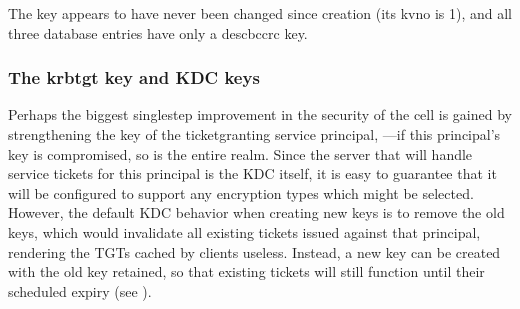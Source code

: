 \documentclass[letterpaper,10pt,english]{sphinxmanual}
\begin{document}
\begin{sphinxVerbatim}[commandchars=\\\{\}]
\PYG{p}{[} \PYG{p}{]}
\PYG{p}{[}\PYG{p}{]}
   
   
\PYG{p}{[}\PYG{p}{]}
\PYG{p}{[} \PYG{p}{]}
\PYG{p}{[}\PYG{p}{]}
   
   
\PYG{p}{[}\PYG{p}{]}
\PYG{p}{[} \PYG{p}{]}
\PYG{p}{[}\PYG{p}{]}
   
   
\PYG{p}{[}\PYG{p}{]}
\end{sphinxVerbatim}

\sphinxAtStartPar
The  key appears to have never been changed since creation
(its kvno is 1), and all three database entries have only a des\sphinxhyphen{}cbc\sphinxhyphen{}crc key.


\subsubsection{The krbtgt key and KDC keys}
\label{\detokenize{admin/advanced/retiring-des:the-krbtgt-key-and-kdc-keys}}
\sphinxAtStartPar
Perhaps the biggest single\sphinxhyphen{}step improvement in the security of the cell
is gained by strengthening the key of the ticket\sphinxhyphen{}granting service principal,
—if this principal’s key is compromised, so is the
entire realm.  Since the server that will handle service tickets
for this principal is the KDC itself, it is easy to guarantee that it
will be configured to support any encryption types which might be
selected.  However, the default KDC behavior when creating new keys is to
remove the old keys, which would invalidate all existing tickets issued
against that principal, rendering the TGTs cached by clients useless.
Instead, a new key can be created with the old key retained, so that
existing tickets will still function until their scheduled expiry
(see {\hyperref[\detokenize{admin/database:changing-krbtgt-key}]{}}).
\end{document}
